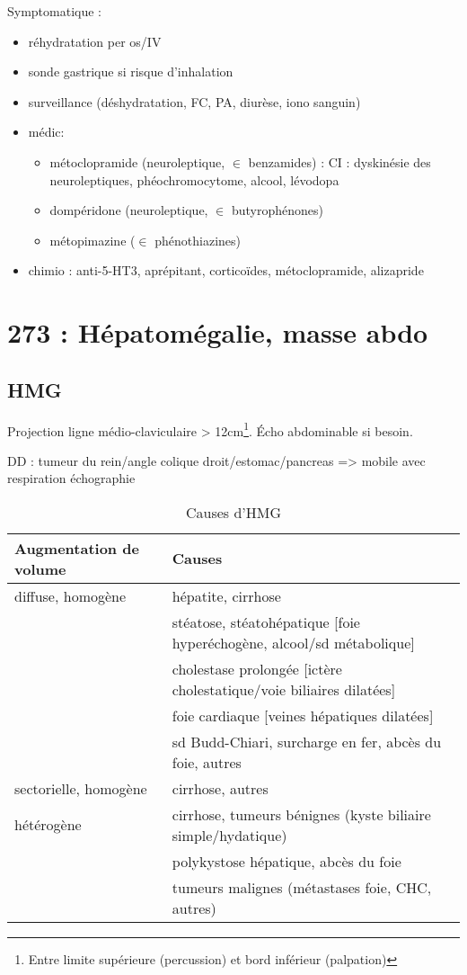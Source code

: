 \documentclass[11pt]{article}
\begin{document}
Symptomatique :
\begin{itemize}
\item réhydratation per os/IV
\item sonde gastrique si risque d'inhalation
\item surveillance (déshydratation, FC, PA, diurèse, iono sanguin)
\item médic: 
\begin{itemize}
\item métoclopramide (neuroleptique, \(\in\) benzamides) : CI : dyskinésie des
neuroleptiques, phéochromocytome, alcool, lévodopa
\item dompéridone (neuroleptique, \(\in\) butyrophénones)
\item métopimazine (\(\in\) phénothiazines)
\end{itemize}
\item chimio : anti-5-HT3, aprépitant, corticoïdes, métoclopramide, alizapride
\end{itemize}

\section{273 : Hépatomégalie, masse abdo}
\label{sec:orgb23be14}

\subsection{\gls{HMG}}
\label{sec:orgde77426}
Projection ligne médio-claviculaire > 12cm\footnote{Entre limite supérieure (percussion) et bord inférieur (palpation)}. Écho abdominable si besoin.

DD : tumeur du rein/angle colique droit/estomac/pancreas => mobile avec
respiration échographie

\begin{table}[htbp]
\caption{Causes d'HMG}
\centering
\begin{tabular}{ll}
\toprule
Augmentation de volume & Causes\\
\midrule
diffuse, homogène & hépatite, cirrhose\\
 & stéatose, stéatohépatique \hfill [foie hyperéchogène, alcool/sd métabolique]\\
 & cholestase prolongée \hfill [ictère cholestatique/voie biliaires dilatées]\\
 & foie cardiaque \hfill [veines hépatiques dilatées]\\
 & sd Budd-Chiari, surcharge en fer, abcès du foie, autres\\
sectorielle, homogène & cirrhose, autres\\
hétérogène & cirrhose, tumeurs bénignes (kyste biliaire simple/hydatique)\\
 & polykystose hépatique, abcès du foie\\
 & tumeurs malignes (métastases foie, CHC, autres)\\
\bottomrule
\end{tabular}
\end{table}
\end{document}
